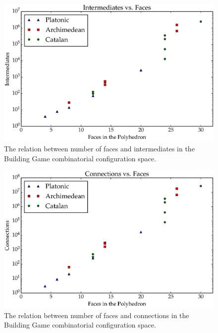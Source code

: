 \begin{figure}[ht]
\centering
  \includegraphics[scale=0.6, angle=0]{images/polys_face_int.eps}
\caption{The relation between number of faces and intermediates in the Building Game combinatorial configuration space.}
\label{fig:FacInt}
\end{figure}

\begin{figure}[ht]
\includegraphics[scale=0.6, angle=0]{images/polys_face_con.eps}
\caption{The relation between number of faces and connections in the Building Game combinatorial configuration space.}
\label{fig:FacCon}
\end{figure}

